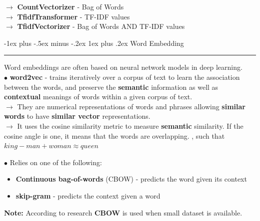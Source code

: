 \documentclass[letterpaper, 10.5pt,landscape]{article}
\makeatletter
\renewcommand{\subsubsection}{\@startsection{subsubsection}{3}{0mm}%
                                {-1ex plus -.5ex minus -.2ex}%
                                {1ex plus .2ex}%
                                {\normalfont\small\bfseries}}
\makeatother
\begin{document}
\begin{multicols*}{3}
\begin{itemize}[label={--},leftmargin=4mm]
\vspace{3pt}
$\rightarrow$ \textbf{CountVectorizer} - Bag of Words \\
$\rightarrow$ \textbf{TfidfTransformer} - TF-IDF values \\
$\rightarrow$ \textbf{TfidfVectorizer} - Bag of Words AND TF-IDF values \\



\end{itemize}








\subsubsection{Word Embedding}  {\color{teal}\hrule height 0.5pt} \smallskip

Word embeddings are often based on neural network models in deep learning. \\


\vspace{3pt}
$\bullet$ \textbf{word2vec} - trains iteratively over a corpus of text to learn the association between the words, and preserve the \textbf{semantic} information as well as \textbf{contextual} meanings of words within a given corpus of text. \\

$\rightarrow$ They are numerical representations of words and phrases allowing \textbf{similar words} to have \textbf{similar vector} representations.\\


$\rightarrow$ It uses the cosine similarity metric to measure \textbf{semantic} similarity. If the cosine angle is one, it means that the words are overlapping. , such that $king - man + woman \approx queen$

$\bullet$ Relies on one of the following:
\begin{itemize}[label={--},leftmargin=4mm]
\vspace{-3pt}
\item \textbf{Continuous bag-of-words} (CBOW) - predicts the word given its context
\vspace{-3pt}
\item \textbf{skip-gram} - predicts the context given a word
\end{itemize}

\vspace{3pt}
\textbf{Note:} According to research \textbf{CBOW} is used when small dataset is available.


\end{multicols*}
\end{document}
